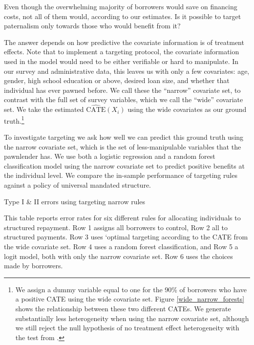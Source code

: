 \begin{appendix}
Even though the overwhelming majority of borrowers would save on financing costs, not all of them would, according to our estimates. Is it possible to target paternalism only towards those who would benefit from it?  

The answer depends on how predictive the covariate information is of treatment effects. Note that to implement a targeting protocol, the covariate information used in the model would need to be either verifiable or hard to manipulate. In our survey and administrative data, this leaves us with only a few covariates: age, gender, high school education or above, desired loan size, and whether that individual has ever pawned before. 
We call these the ``narrow'' covariate set, to contrast with the full set of survey variables, which we call the ``wide'' covariate set.  We take the estimated   $\widehat{\text{CATE}}(X_i)$ using the wide covariates as our ground truth.\footnote{We assign a dummy variable equal to one for the 90\% of borrowers who have a positive CATE using the wide covariate set. Figure \ref{wide_narrow_forests} shows the relationship between these two different  CATEs.  We generate substantially less heterogeneity when using the narrow covariate set, although we still reject the null hypothesis of no treatment effect heterogeneity with the test from \cite{chernozhukov2018generic}.} 

To investigate targeting we ask how well we can predict this ground truth using the narrow covariate set, which is the set of less-manipulable variables that the pawnlender has. We use both a logistic regression and a random forest classification model using the narrow covariate set to predict positive benefits at the individual level.  We compare the in-sample performance of targeting rules against a policy of universal mandated structure.


\begin{table}[H]
\caption{Type I \& II errors using targeting narrow rules}
\label{hit_miss_rule}
\begin{center}
\footnotesize{}
\end{center}
\scriptsize{This table reports error rates for six different rules for allocating individuals to structured repayment. Row 1 assigns all borrowers to control, Row 2 all to structured payments. Row 3 uses `optimal targeting according to the CATE from the wide covariate set. Row 4 uses a random forest classification, and Row 5 a logit model, both with only the narrow covariate set.  Row 6 uses the choices made by borrowers. %
}
\end{table} 


\end{appendix}
